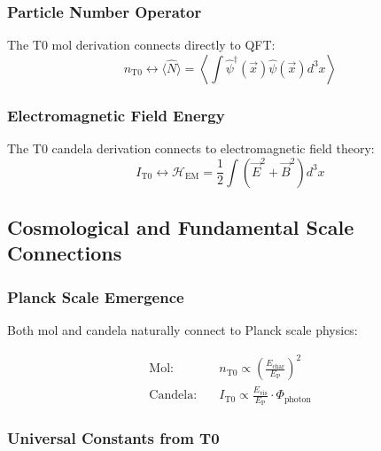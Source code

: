 \documentclass[12pt,a4paper]{article}
\newcommand{\EP}{E_{\text{P}}}
\newcommand{\Echar}{E_{\text{char}}}
\newcommand{\Evis}{E_{\text{vis}}}
\newcommand{\Phiphoton}{\Phi_{\text{photon}}}
\begin{document}
	\subsubsection{Particle Number Operator}
	\label{subsubsec:particle_number_operator}
	
	The T0 mol derivation connects directly to QFT:
	\begin{equation}
		n_{\text{T0}} \leftrightarrow \langle \hat{N} \rangle = \left\langle \int \hat{\psi}^\dagger(\vec{x}) \hat{\psi}(\vec{x}) d^3x \right\rangle
		\label{eq:mol_qft_connection}
	\end{equation}
	
	\subsubsection{Electromagnetic Field Energy}
	\label{subsubsec:em_field_energy}
	
	The T0 candela derivation connects to electromagnetic field theory:
	\begin{equation}
		I_{\text{T0}} \leftrightarrow \mathcal{H}_{\text{EM}} = \frac{1}{2}\int (\vec{E}^2 + \vec{B}^2) d^3x
		\label{eq:candela_em_connection}
	\end{equation}
	
	\subsection{Cosmological and Fundamental Scale Connections}
	\label{subsec:cosmological_connections}
	
	\subsubsection{Planck Scale Emergence}
	\label{subsubsec:planck_scale_emergence}
	
	Both mol and candela naturally connect to Planck scale physics:
	
	\begin{align}
		\text{Mol:} \quad &n_{\text{T0}} \propto \left(\frac{\Echar}{\EP}\right)^2 \\
		\text{Candela:} \quad &I_{\text{T0}} \propto \frac{\Evis}{\EP} \cdot \Phiphoton
	\end{align}
	
	\subsubsection{Universal Constants from T0}
	\label{subsubsec:universal_constants_t0}
	
\end{document}
